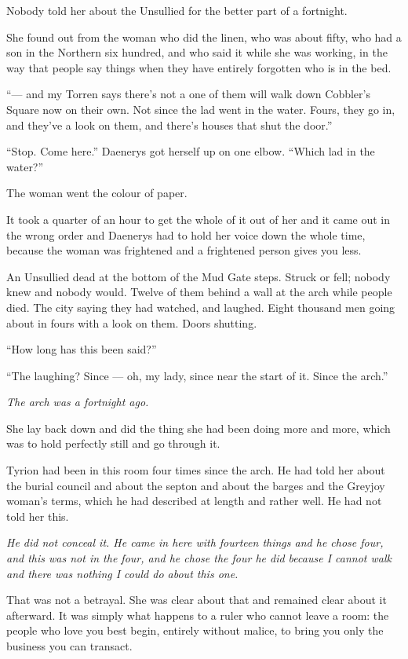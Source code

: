 Nobody told her about the Unsullied for the better part of a fortnight.

She found out from the woman who did the linen, who was about fifty, who had a son in the Northern six hundred, and who said it while she was working, in the way that people say things when they have entirely forgotten who is in the bed.

“— and my Torren says there’s not a one of them will walk down Cobbler’s Square now on their own. Not since the lad went in the water. Fours, they go in, and they’ve a look on them, and there’s houses that shut the door.”

“Stop. Come here.” Daenerys got herself up on one elbow. “Which lad in the water?”

The woman went the colour of paper.

It took a quarter of an hour to get the whole of it out of her and it came out in the wrong order and Daenerys had to hold her voice down the whole time, because the woman was frightened and a frightened person gives you less.

An Unsullied dead at the bottom of the Mud Gate steps. Struck or fell; nobody knew and nobody would. Twelve of them behind a wall at the arch while people died. The city saying they had watched, and laughed. Eight thousand men going about in fours with a look on them. Doors shutting.

“How long has this been said?”

“The laughing? Since — oh, my lady, since near the start of it. Since the arch.”

\textit{The arch was a fortnight ago.}

She lay back down and did the thing she had been doing more and more, which was to hold perfectly still and go through it.

Tyrion had been in this room four times since the arch. He had told her about the burial council and about the septon and about the barges and the Greyjoy woman’s terms, which he had described at length and rather well. He had not told her this.

\textit{He did not conceal it. He came in here with fourteen things and he chose four, and this was not in the four, and he chose the four he did because I cannot walk and there was nothing I could do about this one.}

That was not a betrayal. She was clear about that and remained clear about it afterward. It was simply what happens to a ruler who cannot leave a room: the people who love you best begin, entirely without malice, to bring you only the business you can transact.

